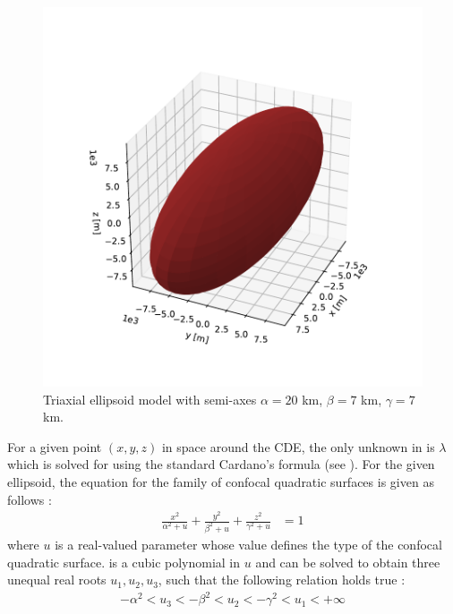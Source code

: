 \begin{figure}[htb]
\centering
\captionsetup{justification=centering}
\includegraphics[width=\textwidth, height=0.27\textheight, keepaspectratio=true]{cde.pdf}
\caption{Triaxial ellipsoid model with semi-axes $\alpha=20$ km, $\beta=7$ km, $\gamma=7$ km.}
\label{fig:cde}
\end{figure}
\FloatBarrier
For a given point $(x, y, z)$ in space around the \gls{CDE}, the only unknown in  is $\lambda$ which is solved for using the standard Cardano's formula (see \cite{cubic_formula}). For the given ellipsoid, the equation for the family of confocal quadratic surfaces is given as follows \parencite{ellipsoid_potential_model}:
\begin{align}
    \frac{x^2}{\alpha^2 + u} + \frac{y^2}{\beta^2 + u} + \frac{z^2}{\gamma^2 + u} &= 1
    \label{eqn:confocal_quadrics}
\end{align}
where $u$ is a real-valued parameter whose value defines the type of the confocal quadratic surface.  is a cubic polynomial in $u$ and can be solved to obtain three unequal real roots $u_1, u_2, u_3$, such that the following relation holds true \parencite{ellipsoid_potential_model}:
\begin{align}
    -\alpha^2 < u_3 < -\beta^2 < u_2 < -\gamma^2 < u_1 < +\infty
    \label{eqn:confocal_quadrics_all_real_roots}
\end{align}
